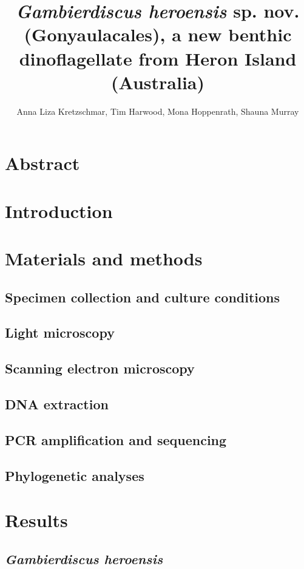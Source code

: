\documentclass[12pt]{article}
\title{\textbf{ \emph{Gambierdiscus heroensis} sp. nov. (Gonyaulacales), a new benthic dinoflagellate from Heron Island (Australia)}}
\author{Anna Liza Kretzschmar, Tim Harwood, Mona Hoppenrath, Shauna Murray}
\date{}
\begin{document}
\maketitle

\section{Abstract}

\section{Introduction}

\section{Materials and methods}

\subsection{Specimen collection and culture conditions}

\subsection{Light microscopy}

\subsection{Scanning electron microscopy}

\subsection{DNA extraction}

\subsection{PCR amplification and sequencing}

\subsection{Phylogenetic analyses}

\section{Results}

\subsection{\emph{Gambierdiscus heroensis}}
\end{document}
